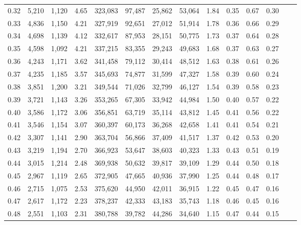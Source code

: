 \begin{tabular}{rrrrrrrrrrrrrr}
0.32 &   5,210 &  1,120 &    4.65 &  323,083 &   97,487 &  25,862 &  53,064 &  1.84 &  0.35 &  0.67 &      0.30 \\
0.33 &   4,836 &  1,150 &    4.21 &  327,919 &   92,651 &  27,012 &  51,914 &  1.78 &  0.36 &  0.66 &      0.29 \\
0.34 &   4,698 &  1,139 &    4.12 &  332,617 &   87,953 &  28,151 &  50,775 &  1.73 &  0.37 &  0.64 &      0.28 \\
0.35 &   4,598 &  1,092 &    4.21 &  337,215 &   83,355 &  29,243 &  49,683 &  1.68 &  0.37 &  0.63 &      0.27 \\
0.36 &   4,243 &  1,171 &    3.62 &  341,458 &   79,112 &  30,414 &  48,512 &  1.63 &  0.38 &  0.61 &      0.26 \\
0.37 &   4,235 &  1,185 &    3.57 &  345,693 &   74,877 &  31,599 &  47,327 &  1.58 &  0.39 &  0.60 &      0.24 \\
0.38 &   3,851 &  1,200 &    3.21 &  349,544 &   71,026 &  32,799 &  46,127 &  1.54 &  0.39 &  0.58 &      0.23 \\
0.39 &   3,721 &  1,143 &    3.26 &  353,265 &   67,305 &  33,942 &  44,984 &  1.50 &  0.40 &  0.57 &      0.22 \\
0.40 &   3,586 &  1,172 &    3.06 &  356,851 &   63,719 &  35,114 &  43,812 &  1.45 &  0.41 &  0.56 &      0.22 \\
0.41 &   3,546 &  1,154 &    3.07 &  360,397 &   60,173 &  36,268 &  42,658 &  1.41 &  0.41 &  0.54 &      0.21 \\
0.42 &   3,307 &  1,141 &    2.90 &  363,704 &   56,866 &  37,409 &  41,517 &  1.37 &  0.42 &  0.53 &      0.20 \\
0.43 &   3,219 &  1,194 &    2.70 &  366,923 &   53,647 &  38,603 &  40,323 &  1.33 &  0.43 &  0.51 &      0.19 \\
0.44 &   3,015 &  1,214 &    2.48 &  369,938 &   50,632 &  39,817 &  39,109 &  1.29 &  0.44 &  0.50 &      0.18 \\
0.45 &   2,967 &  1,119 &    2.65 &  372,905 &   47,665 &  40,936 &  37,990 &  1.25 &  0.44 &  0.48 &      0.17 \\
0.46 &   2,715 &  1,075 &    2.53 &  375,620 &   44,950 &  42,011 &  36,915 &  1.22 &  0.45 &  0.47 &      0.16 \\
0.47 &   2,617 &  1,172 &    2.23 &  378,237 &   42,333 &  43,183 &  35,743 &  1.18 &  0.46 &  0.45 &      0.16 \\
0.48 &   2,551 &  1,103 &    2.31 &  380,788 &   39,782 &  44,286 &  34,640 &  1.15 &  0.47 &  0.44 &      0.15 \\

\end{tabular}
